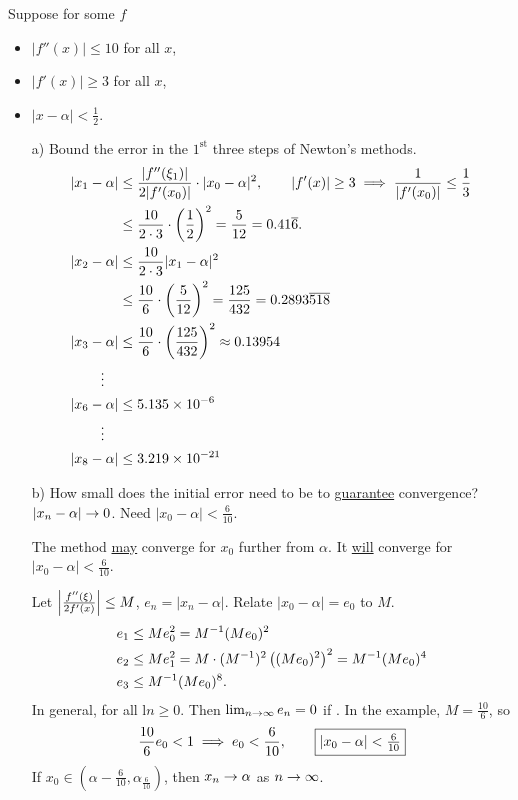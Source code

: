 \documentclass[]{article}
\begin{document}
\begin{example}
	Suppose for some $f$
	\begin{itemize}
		\item $|f''(x)|\leq 10$ for all $x$,
		\item $|f'(x)| \geq 3$ for all $x$,
		\item $|x-\alpha|<\frac12$.
	\end{itemize}
	\begin{enumerate}
		\item[a)] Bound the error in the $1^\text{st}$ three steps of Newton's methods.
			\begin{align*}
				|x_1-\alpha| &\leq \frac{|f''(\xi_1)|}{2|f'(x_0)|}\cdot|x_0-\alpha|^2, \qquad |f'(x)|\geq 3\implies \frac1{|f'(x_0)|} \leq\frac13 \\
							 &\leq \frac{10}{2\cdot3}\cdot\left(\frac12\right)^2
							 = \frac5{12} = 0.41\overline{6}. \\
				|x_2 - \alpha| &\leq \frac{10}{2\cdot3}|x_1-\alpha|^2 \\
							   &\leq \frac{10}6\cdot\left(\frac5{12}\right)^2
							   = \frac{125}{432} = 0.2893\overline{518} \\
				|x_3-\alpha| &\leq \frac{10}6\cdot\left(\frac{125}{432}\right)^2 \approx 0.13954 \\
				\vdots\quad & \\
				|x_6-\alpha| &\leq 5.135\times10^{-6} \\
				\vdots\quad & \\
				|x_8-\alpha| &\leq 3.219\times10^{-21}
			\end{align*}
		\item[b)] How small does the initial error need to be to \ul{guarantee} convergence? $|x_n-\alpha|\rightarrow0$.
			Need $|x_0-\alpha|<\frac6{10}$.
			\begin{note}
				The method \ul{may} converge for $x_0$ further from $\alpha$. It \ul{will} converge for $|x_0-\alpha|<\frac6{10}$.
			\end{note}
			Let $\left|\frac{f''(\xi)}{2f'(x)}\right|\leq M$, $e_n=|x_n-\alpha|$.
			Relate $|x_0-\alpha|=e_0$ to $M$.
			\begin{align*}
				e_1 &\leq Me_0^2 = M^{-1}(Me_0)^2 \\
				e_2 &\leq Me_1^2 = M\cdot(M^{-1})^2 \left((Me_0)^2\right)^2 = M^{-1}(Me_0)^4 \\
				e_3 &\leq M^{-1}(Me_0)^8.
			\end{align*}
			In general,  for all l$n\geq0$.
			Then $\lim_{n\rightarrow\infty}e_n=0$ if .
			In the example, $M=\frac{10}6$, so $$\frac{10}6e_0<1 \implies e_0<\frac6{10}, \qquad \fbox{$|x_0-\alpha|<\frac6{10}$}$$
			If $x_0\in(\alpha-\frac6{10},\alpha_\frac6{10})$, then $x_n\rightarrow\alpha$ as $n\rightarrow\infty$.
	\end{enumerate}
\end{example}
\end{document}
